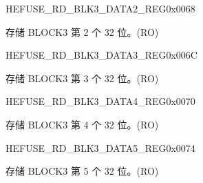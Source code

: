 \begin{register}{H}{EFUSE\_RD\_BLK3\_DATA2\_REG}{0x0068}\label{regdesc:EFUSERDBLK3DATA2REG}
%
\regnewline%
\begin{regdesc}\begin{reglist}
\label{fielddesc:EFUSEBLK3DATA2}\item [EFUSE\_BLK3\_DATA2] 存储 BLOCK3 第 2 个 32 位。(RO)
\end{reglist}\end{regdesc}
\end{register}


\begin{register}{H}{EFUSE\_RD\_BLK3\_DATA3\_REG}{0x006C}\label{regdesc:EFUSERDBLK3DATA3REG}
%
\regnewline%
\begin{regdesc}\begin{reglist}
\label{fielddesc:EFUSEBLK3DATA3}\item [EFUSE\_BLK3\_DATA3] 存储 BLOCK3 第 3 个 32 位。(RO)
\end{reglist}\end{regdesc}
\end{register}


\begin{register}{H}{EFUSE\_RD\_BLK3\_DATA4\_REG}{0x0070}\label{regdesc:EFUSERDBLK3DATA4REG}
%
\regnewline%
\begin{regdesc}\begin{reglist}
\label{fielddesc:EFUSEBLK3DATA4}\item [EFUSE\_BLK3\_DATA4] 存储 BLOCK3 第 4 个 32 位。(RO)
\end{reglist}\end{regdesc}
\end{register}


\begin{register}{H}{EFUSE\_RD\_BLK3\_DATA5\_REG}{0x0074}\label{regdesc:EFUSERDBLK3DATA5REG}
%
\regnewline%
\begin{regdesc}\begin{reglist}
\label{fielddesc:EFUSEBLK3DATA5}\item [EFUSE\_BLK3\_DATA5] 存储 BLOCK3 第 5 个 32 位。(RO)
\end{reglist}\end{regdesc}
\end{register}



